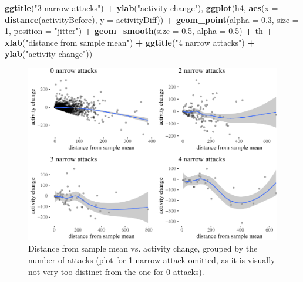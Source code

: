 \documentclass[10pt,]{scrartcl}
\newenvironment{Shaded}{\begin{snugshade}}{\end{snugshade}}
\newcommand{\KeywordTok}[1]{\textcolor[rgb]{0.13,0.29,0.53}{\textbf{#1}}}
\newcommand{\DataTypeTok}[1]{\textcolor[rgb]{0.13,0.29,0.53}{#1}}
\newcommand{\DecValTok}[1]{\textcolor[rgb]{0.00,0.00,0.81}{#1}}
\newcommand{\FloatTok}[1]{\textcolor[rgb]{0.00,0.00,0.81}{#1}}
\newcommand{\StringTok}[1]{\textcolor[rgb]{0.31,0.60,0.02}{#1}}
\newcommand{\OperatorTok}[1]{\textcolor[rgb]{0.81,0.36,0.00}{\textbf{#1}}}
\newcommand{\NormalTok}[1]{#1}
\begin{document}
\begin{Shaded}
\begin{Highlighting}[]
\StringTok{    }\KeywordTok{ggtitle}\NormalTok{(}\StringTok{"3 narrow attacks"}\NormalTok{) }\OperatorTok{+}\StringTok{ }\KeywordTok{ylab}\NormalTok{(}\StringTok{"activity change"}\NormalTok{), }\KeywordTok{ggplot}\NormalTok{(h4,}
    \KeywordTok{aes}\NormalTok{(}\DataTypeTok{x =} \KeywordTok{distance}\NormalTok{(activityBefore), }\DataTypeTok{y =}\NormalTok{ activityDiff)) }\OperatorTok{+}\StringTok{ }\KeywordTok{geom_point}\NormalTok{(}\DataTypeTok{alpha =} \FloatTok{0.3}\NormalTok{,}
    \DataTypeTok{size =} \DecValTok{1}\NormalTok{, }\DataTypeTok{position =} \StringTok{"jitter"}\NormalTok{) }\OperatorTok{+}\StringTok{ }\KeywordTok{geom_smooth}\NormalTok{(}\DataTypeTok{size =} \FloatTok{0.5}\NormalTok{,}
    \DataTypeTok{alpha =} \FloatTok{0.5}\NormalTok{) }\OperatorTok{+}\StringTok{ }\NormalTok{th }\OperatorTok{+}\StringTok{ }\KeywordTok{xlab}\NormalTok{(}\StringTok{"distance from sample mean"}\NormalTok{) }\OperatorTok{+}\StringTok{ }\KeywordTok{ggtitle}\NormalTok{(}\StringTok{"4 narrow attacks"}\NormalTok{) }\OperatorTok{+}
\StringTok{    }\KeywordTok{ylab}\NormalTok{(}\StringTok{"activity change"}\NormalTok{))}
\end{Highlighting}
\end{Shaded}

\normalsize

\begin{figure}

\begin{center}\includegraphics[width=1\linewidth]{redditAnalysisWalkthrough_files/figure-latex/unnamed-chunk-113-1} \end{center}
\caption{Distance from sample mean vs. activity change, grouped by the number of attacks (plot for 1 narrow attack omitted, as it is visually not very too distinct from the one for 0 attacks).}
\label{fig:regression}
\end{figure}
\end{document}

